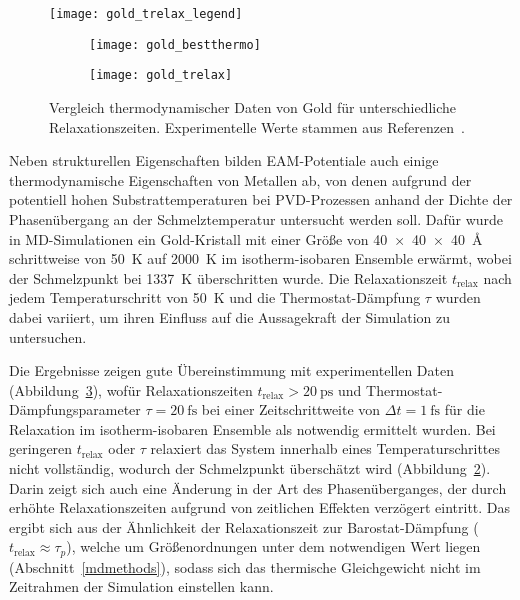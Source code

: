 \begin{figure}[b!]

  \centering
  \captionsetup[subfigure]{singlelinecheck=false}

  \texttt{[image: gold\_trelax\_legend]}

  \def\subfigwidth{7cm}
  \begin{subfigure}[t]{\subfigwidth}
    \texttt{[image: gold\_bestthermo]}
    \label{fig:goldthermo-a}
  \end{subfigure}
  \hfill
  \begin{subfigure}[t]{\subfigwidth}
    \texttt{[image: gold\_trelax]}
    \label{fig:goldthermo-b}
  \end{subfigure}

  \caption[Vergleich thermodynamischer Daten von Gold]{
    Vergleich thermodynamischer Daten von Gold für unterschiedliche Relaxationszeiten.
    Experimentelle Werte stammen aus Referenzen~\cite{haynes_crc_2011,brillo_density_2006}.
  }
  \label{fig:goldthermo}
\end{figure}

Neben strukturellen Eigenschaften bilden EAM-Potentiale auch einige thermodynamische Eigenschaften von Metallen ab, von denen aufgrund der potentiell hohen Substrattemperaturen bei PVD-Prozessen\cite{gottsche_uber_1956} anhand der Dichte der Phasenübergang an der Schmelztemperatur untersucht werden soll.
Dafür wurde in MD-Simulationen ein Gold-Kristall mit einer Größe von \SI{40x40x40}{\angstrom} schrittweise von \SI{50}{\kelvin} auf \SI{2000}{\kelvin} im isotherm-isobaren Ensemble erwärmt, wobei der Schmelzpunkt bei \SI{1337}{\kelvin}\cite{haynes_crc_2011} überschritten wurde.
Die Relaxationszeit $t_\text{relax}$ nach jedem Temperaturschritt von \SI{50}{\kelvin} und die Thermostat-Dämpfung $\tau$ wurden dabei variiert, um ihren Einfluss auf die Aussagekraft der Simulation zu untersuchen.

Die Ergebnisse zeigen gute Übereinstimmung mit experimentellen Daten\cite{haynes_crc_2011,brillo_density_2006} (Abbildung~\ref{fig:goldthermo}), wofür Relaxationszeiten $t_\text{relax} > \SI{20}{\pico\second}$ und Thermostat-Dämpfungsparameter $\tau = \SI{20}{\femto\second}$ bei einer Zeitschrittweite von $\Delta t = \SI{1}{\femto\second}$ für die Relaxation im isotherm-isobaren Ensemble als notwendig ermittelt wurden.
Bei geringeren $t_\text{relax}$ oder $\tau$ relaxiert das System innerhalb eines Temperaturschrittes nicht vollständig, wodurch der Schmelzpunkt überschätzt wird (Abbildung~\ref{fig:goldthermo-b}).
Darin zeigt sich auch eine Änderung in der Art des Phasenüberganges, der durch erhöhte Relaxationszeiten aufgrund von zeitlichen Effekten verzögert eintritt.
Das ergibt sich aus der Ähnlichkeit der Relaxationszeit zur Barostat-Dämpfung ($t_\text{relax}\approx \tau_p$), welche um Größenordnungen unter dem notwendigen Wert liegen (Abschnitt~\ref{mdmethods}), sodass sich das thermische Gleichgewicht nicht im Zeitrahmen der Simulation einstellen kann.

